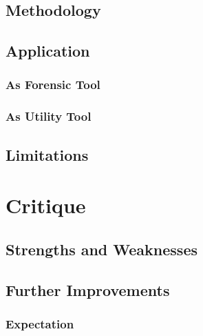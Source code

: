 \documentclass[12pt, letter]{article}
\begin{document}
\blindtext

\subsection{Methodology}

\blindtext

\subsection{Application}

\blindtext

\subsubsection{As Forensic Tool}

\blindtext

\subsubsection{As Utility Tool}

\blindtext

\subsection{Limitations}

\blindtext

\section{Critique}

\blindtext

\subsection{Strengths and Weaknesses}

\blindtext

\subsection{Further Improvements}

\blindtext

\subsubsection{Expectation}
\end{document}
